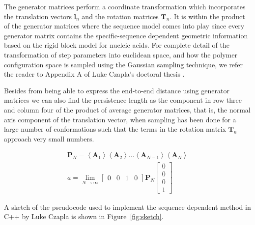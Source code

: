 The  generator  matrices  perform  a coordinate  transformation  which
incorporates the translation vectors $\mathbf{l}_{n}$ and the rotation
matrices $\mathbf{T}_{n}$.  It is within the product  of the generator
matrices  where  the  sequence  model  comes  into  play  since  every
generator  matrix contains  the specific-sequence  dependent geometric
information based  on the  rigid block model  for nucleic  acids.  For
complete  detail  of  the   transformation  of  step  parameters  into
euclidean  space, and how  the polymer  configuration space  is sampled
using the Gaussian sampling technique,  we refer the reader to Appendix
A of Luke Czapla's doctoral thesis \cite{czapla2009}.

Besides from being able to express the end-to-end distance using
generator matrices we can also find the persistence length as the
component in row three and column four of the product of average
generator matrices, that is, the normal axis component of the
translation vector, when sampling has been done for a large number of
conformations such that the terms in the rotation matrix
$\mathbf{T}_{n}$ approach very small numbers.

\begin{gather}
\mathbf{P}_{N} = \left<\mathbf{A}_{1}\right> \left<\mathbf{A}_{2}\right> ... \left<
\mathbf{A}_{N-1}\right> \left< \mathbf{A}_{N}\right>\\
a = \lim_{N \to \infty} \left[\begin{array}{cccc}0 & 0 & 1 & 0\end{array}
    \right] \mathbf{P}_{N}
\left[\begin{array}{c} 0\\ 0\\ 0\\ 1\end{array}\right]
\end{gather}  

A sketch of the pseudocode used to implement the sequence dependent
method in C++ by Luke Czapla is shown in Figure~\ref{fig:sketch}.


